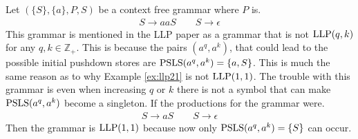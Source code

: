 \begin{example}
    Let $(\{S\}, \{a\}, P, S)$ be a context free grammar where $P$ is.
    \begin{gather*}
        S \to aaS \qquad S \to \epsilon
    \end{gather*}
    This grammar is mentioned in the LLP paper \cite[16]{Vagner2007} as a grammar that is not $\text{LLP}(q,k)$ for any $q, k \in \mathbb{Z}_+$. This is because the pairs $(a^q, a^k)$, that could lead to the possible initial pushdown stores are $\text{PSLS}(a^q, a^k) = \{a, S\}$. This is much the same reason as to why Example \ref{ex:llp21} is not $\text{LLP}(1, 1)$. The trouble with this grammar is even when increasing $q$ or $k$ there is not a symbol that can make $\text{PSLS}(a^q, a^k)$ become a singleton. If the productions for the grammar were.
    \begin{gather*}
        S \to aS \qquad S \to \epsilon
    \end{gather*}
    Then the grammar is $\text{LLP}(1, 1)$ because now only $\text{PSLS}(a^q, a^k) = \{S\}$ can occur.
\end{example}